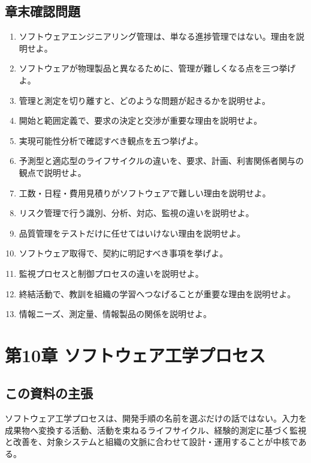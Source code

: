 \documentclass[a4paper,11pt]{ltjsarticle}
\numberwithin{figure}{section}
\numberwithin{table}{section}
\begin{document}
\subsection{章末確認問題}
\begin{enumerate}[leftmargin=2em]
  \item ソフトウェアエンジニアリング管理は、単なる進捗管理ではない。理由を説明せよ。
  \item ソフトウェアが物理製品と異なるために、管理が難しくなる点を三つ挙げよ。
  \item 管理と測定を切り離すと、どのような問題が起きるかを説明せよ。
  \item 開始と範囲定義で、要求の決定と交渉が重要な理由を説明せよ。
  \item 実現可能性分析で確認すべき観点を五つ挙げよ。
  \item 予測型と適応型のライフサイクルの違いを、要求、計画、利害関係者関与の観点で説明せよ。
  \item 工数・日程・費用見積りがソフトウェアで難しい理由を説明せよ。
  \item リスク管理で行う識別、分析、対応、監視の違いを説明せよ。
  \item 品質管理をテストだけに任せてはいけない理由を説明せよ。
  \item ソフトウェア取得で、契約に明記すべき事項を挙げよ。
  \item 監視プロセスと制御プロセスの違いを説明せよ。
  \item 終結活動で、教訓を組織の学習へつなげることが重要な理由を説明せよ。
  \item 情報ニーズ、測定量、情報製品の関係を説明せよ。
\end{enumerate}
\begin{center}
\end{center}

\section{第10章 ソフトウェア工学プロセス}
\subsection*{この資料の主張}
ソフトウェア工学プロセスは、開発手順の名前を選ぶだけの話ではない。入力を成果物へ変換する活動、活動を束ねるライフサイクル、経験的測定に基づく監視と改善を、対象システムと組織の文脈に合わせて設計・運用することが中核である。
\end{document}
